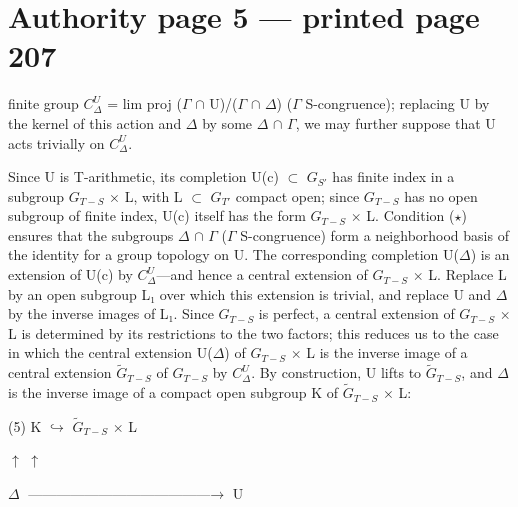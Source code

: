 \documentclass[10pt,a4paper]{article}
\begin{document}
\section*{Authority page 5 --- printed page 207}
\noindent finite group \ensuremath{C^U_Δ} = lim proj (\ensuremath{Γ} \ensuremath{∩} U)/(\ensuremath{Γ} \ensuremath{∩} \ensuremath{Δ}) (\ensuremath{Γ} S-congruence); replacing U by the kernel of this action and \ensuremath{Δ} by some \ensuremath{Δ} \ensuremath{∩} \ensuremath{Γ}, we may further suppose that U acts trivially on \ensuremath{C^U_Δ}.\par
\smallskip
\noindent Since U is T-arithmetic, its completion U(c) \ensuremath{⊂} \ensuremath{G_{S′}} has finite index in a subgroup \ensuremath{G_{T−S}} \ensuremath{×} L, with L \ensuremath{⊂} \ensuremath{G_{T′}} compact open; since \ensuremath{G_{T−S}} has no open subgroup of finite index, U(c) itself has the form \ensuremath{G_{T−S}} \ensuremath{×} L. Condition (\ensuremath{\star}) ensures that the subgroups \ensuremath{Δ} \ensuremath{∩} \ensuremath{Γ} (\ensuremath{Γ} S-congruence) form a neighborhood basis of the identity for a group topology on U. The corresponding completion U(\ensuremath{Δ}) is an extension of U(c) by \ensuremath{C^U_Δ}—and hence a central extension of \ensuremath{G_{T−S}} \ensuremath{×} L. Replace L by an open subgroup L\ensuremath{₁} over which this extension is trivial, and replace U and \ensuremath{Δ} by the inverse images of L\ensuremath{₁}. Since \ensuremath{G_{T−S}} is perfect, a central extension of \ensuremath{G_{T−S}} \ensuremath{×} L is determined by its restrictions to the two factors; this reduces us to the case in which the central extension U(\ensuremath{Δ}) of \ensuremath{G_{T−S}} \ensuremath{×} L is the inverse image of a central extension \ensuremath{\widetilde{G}_{T−S}} of \ensuremath{G_{T−S}} by \ensuremath{C^U_Δ}. By construction, U lifts to \ensuremath{\widetilde{G}_{T−S}}, and \ensuremath{Δ} is the inverse image of a compact open subgroup K of \ensuremath{\widetilde{G}_{T−S}} \ensuremath{×} L:\par
\smallskip
\noindent (5)              K \ensuremath{↪} \ensuremath{\widetilde{G}_{T−S}} \ensuremath{×} L\par
\noindent                  \ensuremath{↑}                 \ensuremath{↑}\par
\noindent                  \ensuremath{Δ} \ensuremath{\text{---}\text{---}\text{---}\text{---}\text{---}\text{---}\text{---}\text{---}\text{---}\text{---}\text{---}\text{---}\text{---}→} U\par
\end{document}
